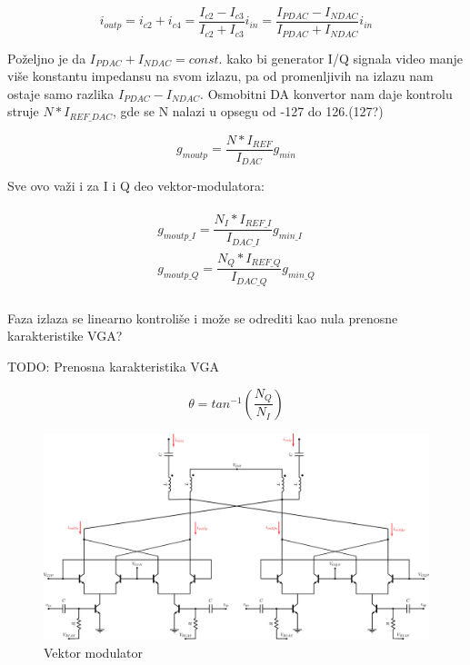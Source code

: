 \documentclass[journal,twocolumn,letterpaper]{IEEEJERM}
\begin{document}
\begin{equation*}
  \label{eqn:out_current}
    i_{outp} = i_{c2} + i_{c4} = \dfrac{I_{c2} - I_{c3}}{I_{c2} + I_{c3}}i_{in} = \dfrac{I_{PDAC} - I_{NDAC}}{I_{PDAC} + I_{NDAC}}i_{in} 
\end{equation*}


Poželjno je da $I_{PDAC} + I_{NDAC} = const.$ kako bi generator I/Q signala video manje više konstantu impedansu na svom izlazu, pa od promenljivih na izlazu nam ostaje samo razlika $I_{PDAC} - I_{NDAC}$. Osmobitni DA konvertor nam daje kontrolu struje $N * I_{REF\_DAC}$, gde se N nalazi u opsegu od -127 do 126.(127?)

\begin{equation}
  \label{eqn:gm_out}
    g_{moutp} = \dfrac{N*I_{REF}}{I_{DAC}} g_{min}
\end{equation}

Sve ovo važi i za I i Q deo vektor-modulatora:

\begin{align}
  \label{eqn:gm_IQ}
  \begin{split}
    g_{moutp\_I} = \dfrac{N_I*I_{REF\_I}}{I_{DAC\_I}} g_{min\_I} \\
    g_{moutp\_Q} = \dfrac{N_Q*I_{REF\_Q}}{I_{DAC\_Q}} g_{min\_Q} \\
  \end{split}
\end{align}

Faza izlaza se linearno kontroliše i može se odrediti kao nula prenosne karakteristike VGA?

TODO: Prenosna karakteristika VGA

\begin{equation}
  \label{eqn:out_phase}
  \theta = tan^{-1}(\dfrac{N_{Q}}{N_{I}})
\end{equation}


\begin{figure}[!htbp]
  \centering
  \includegraphics[width=\linewidth]{vmod.pdf}
  \caption{Vektor modulator}
  \label{fig:vmod}
\end{figure}
\end{document}
